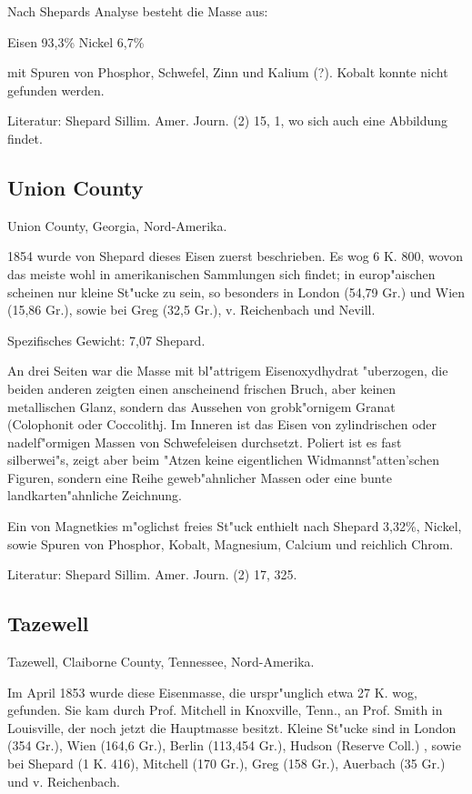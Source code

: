 \documentclass[a4paper, 11pt, oneside]{article}
\begin{document}
Nach Shepards Analyse besteht die Masse aus:

Eisen 93,3\%  
Nickel 6,7\%

mit Spuren von Phosphor, Schwefel, Zinn und Kalium (?). Kobalt konnte nicht gefunden werden.

Literatur: Shepard Sillim. Amer. Journ. (2) 15, 1, wo sich auch eine Abbildung findet.

\subsection{Union County}

Union County, Georgia, Nord-Amerika.

1854 wurde von Shepard dieses Eisen zuerst beschrieben. Es wog 6 K. 800, wovon das meiste wohl in amerikanischen Sammlungen sich findet; in europ"aischen scheinen nur kleine St"ucke zu sein, so besonders in London (54,79 Gr.) und Wien (15,86 Gr.), sowie bei Greg (32,5 Gr.), v. Reichenbach und Nevill.

Spezifisches Gewicht: 7,07 Shepard.

An drei Seiten war die Masse mit bl"attrigem Eisenoxydhydrat "uberzogen, die beiden anderen zeigten einen anscheinend frischen Bruch, aber keinen metallischen Glanz, sondern das Aussehen von grobk"ornigem Granat (Colophonit oder Coccolithj. Im Inneren ist das Eisen von zylindrischen oder nadelf"ormigen Massen von Schwefeleisen durchsetzt. Poliert ist es fast silberwei"s, zeigt aber beim "Atzen keine eigentlichen Widmannst"atten'schen Figuren, sondern eine Reihe geweb"ahnlicher Massen oder eine bunte landkarten"ahnliche Zeichnung.

Ein von Magnetkies m"oglichst freies St"uck enthielt nach Shepard 3,32\%, Nickel, sowie Spuren von Phosphor, Kobalt, Magnesium, Calcium und reichlich Chrom.

Literatur: Shepard Sillim. Amer. Journ. (2) 17, 325.

\subsection{Tazewell}

Tazewell, Claiborne County, Tennessee, Nord-Amerika.

Im April 1853 wurde diese Eisenmasse, die urspr"unglich etwa 27 K. wog, gefunden. Sie kam durch Prof. Mitchell in Knoxville, Tenn., an Prof. Smith in Louisville, der noch jetzt die Hauptmasse besitzt. Kleine St"ucke sind in London (354 Gr.), Wien (164,6 Gr.), Berlin (113,454 Gr.), Hudson (Reserve Coll.) , sowie bei Shepard (1 K. 416), Mitchell (170 Gr.), Greg (158 Gr.), Auerbach (35 Gr.) und v. Reichenbach.
\end{document}
